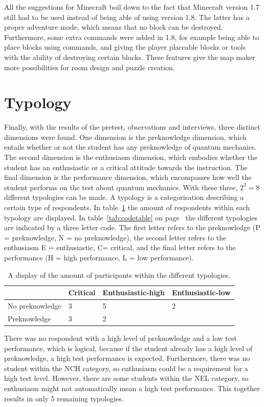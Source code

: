\documentclass[11pt,twoside]{report} %
\begin{document}
All the suggestions for Minecraft boil down to the fact that Minecraft version 1.7 still had to be used instead of being able of using version 1.8. The latter has a proper adventure mode, which means that no block can be destroyed. Furthermore, some extra commands were added in 1.8, for example being able to place blocks using commands, and giving the player placeable blocks or tools with the ability of destroying certain blocks. These features give the map maker more possibilities for room design and puzzle creation.

\section{Typology}

Finally, with the results of the pretest, observations and interviews, three distinct dimensions were found. One dimension is the preknowledge dimension, which entails whether or not the student has any preknowledge of quantum mechanics. The second dimension is the enthusiasm dimension, which embodies whether the student has an enthusiastic or a critical attitude towards the instruction. The final dimension is the performance dimension, which encompasses how well the student performs on the test about quantum mechanics. With these three, $2^3=8$ different typologies can be made. A typology is a categorisation describing a certain type of respondents. In table~\ref{tab:typology} the amount of respondents within each typology are displayed. In table~\ref{tab:codetable} on page~\pageref{tab:codetable} the different typologies are indicated by a three letter code. The first letter refers to the preknowledge (P = preknowledge, N = no preknowledge), the second letter refers to the enthusiasm {E = enthusiastic, C= critical}, and the final letter refers to the performance (H = high performance, L = low performance).

\begin{table}[htbp]
\begin{tabular}{|l|l|l|l|}
\hline
 & Critical & Enthusiastic-high & Enthusiastic-low \\ \hline
No preknowledge & 3 & 5 & 2 \\ \hline
Preknowledge & 3 & 2 &  \\ \hline
\end{tabular}
\caption{A display of the amount of participants within the different typologies.\label{tab:typology}}
\end{table}

There was no respondent with a high level of preknowledge and a low test performance, which is logical, because if the student already has a high level of preknowledge, a high test performance is expected. Furthermore, there was no student within the NCH category, so enthusiasm could be a requirement for a high test level. However, there are some students within the NEL category, so enthusiasm might not automatically mean a high test performance. This together results in only 5 remaining typologies.
\end{document}
